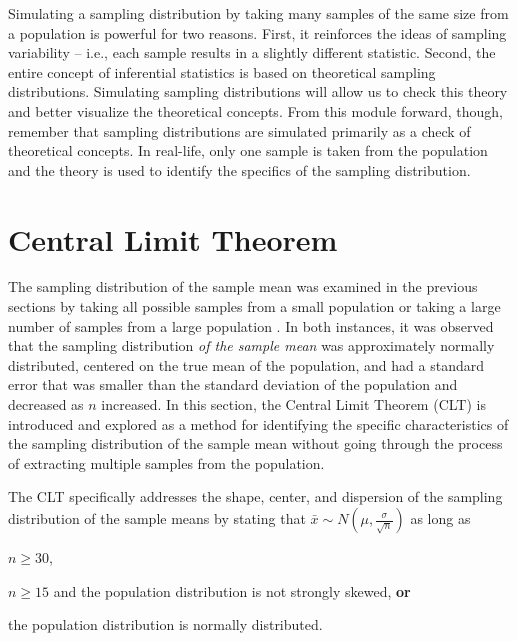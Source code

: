 \documentclass[10pt,openany]{book}\usepackage[]{graphicx}\usepackage[]{color}
\begin{document}
Simulating a sampling distribution by taking many samples of the same size from a population is powerful for two reasons.  First, it reinforces the ideas of sampling variability -- i.e., each sample results in a slightly different statistic.  Second, the entire concept of inferential statistics is based on theoretical sampling distributions.  Simulating sampling distributions will allow us to check this theory and better visualize the theoretical concepts.  From this module forward, though, remember that sampling distributions are simulated primarily as a check of theoretical concepts.  In real-life, only one sample is taken from the population and the theory is used to identify the specifics of the sampling distribution.



\section{Central Limit Theorem} \label{sect:CLT}
\vspace{-12pt}
The sampling distribution of the sample mean was examined in the previous sections by taking all possible samples from a small population  or taking a large number of samples from a large population .  In both instances, it was observed that the sampling distribution \textit{of the sample mean} was approximately normally distributed, centered on the true mean of the population, and had a standard error that was smaller than the standard deviation of the population and decreased as $n$ increased.  In this section, the Central Limit Theorem (CLT) is introduced and explored as a method for identifying the specific characteristics of the sampling distribution of the sample mean without going through the process of extracting multiple samples from the population.

The CLT specifically addresses the shape, center, and dispersion of the sampling distribution of the sample means by stating that $\bar{x}\sim N\left(\mu,\frac{\sigma}{\sqrt{n}}\right)$ as long as

\begin{Itemize}
  \item $n\geq30$,
  \item $n\geq15$ and the population distribution is not strongly skewed, \textbf{or}
  \item the population distribution is normally distributed.
\end{Itemize}
\end{document}
